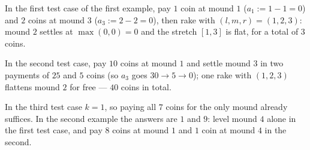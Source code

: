 In the first test case of the first example, pay $1$ coin at mound $1$ ($a_1 := 1 - 1 = 0$) and $2$ coins at mound $3$ ($a_3 := 2 - 2 = 0$), then rake with $(l, m, r) = (1, 2, 3)$: mound $2$ settles at $\max(0, 0) = 0$ and the stretch $[1, 3]$ is flat, for a total of $3$ coins.

In the second test case, pay $10$ coins at mound $1$ and settle mound $3$ in two payments of $25$ and $5$ coins (so $a_3$ goes $30 \to 5 \to 0$); one rake with $(1, 2, 3)$ flattens mound $2$ for free --- $40$ coins in total.

In the third test case $k = 1$, so paying all $7$ coins for the only mound already suffices. In the second example the answers are $1$ and $9$: level mound $4$ alone in the first test case, and pay $8$ coins at mound $1$ and $1$ coin at mound $4$ in the second.
